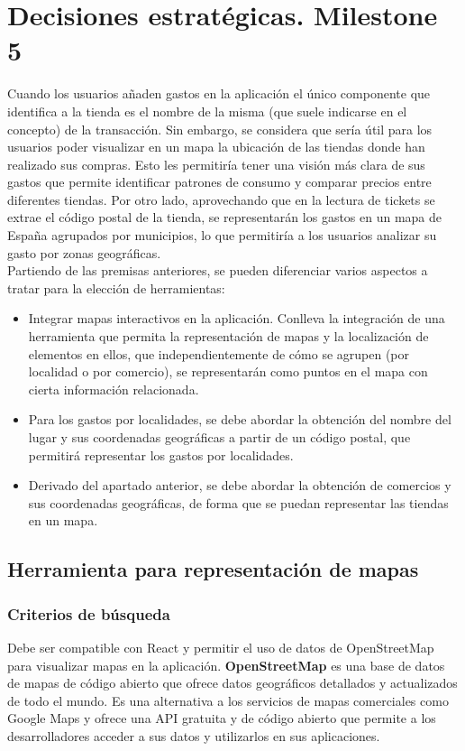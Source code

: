\section{Decisiones estratégicas. Milestone 5}
Cuando los usuarios añaden gastos en la aplicación el único componente que identifica a la tienda es el nombre de la misma (que suele indicarse en el concepto) de la transacción. Sin embargo, se considera que sería útil para los usuarios poder visualizar en un mapa la ubicación de las tiendas donde han realizado sus compras. Esto les permitiría tener una visión más clara de sus gastos que permite identificar patrones de consumo y comparar precios entre diferentes tiendas. Por otro lado, aprovechando que en la lectura de tickets se extrae el código postal de la tienda, se representarán los gastos en un mapa de España agrupados por municipios, lo que permitiría a los usuarios analizar su gasto por zonas geográficas.\\

Partiendo de las premisas anteriores, se pueden diferenciar varios aspectos a tratar para la elección de herramientas:

\begin{itemize}
    \item Integrar mapas interactivos en la aplicación. Conlleva la integración de una herramienta que permita la representación de mapas y la localización de elementos en ellos, que independientemente de cómo se agrupen (por localidad o por comercio), se representarán como puntos en el mapa con cierta información relacionada.
    \item  Para los gastos por localidades, se debe abordar la obtención del nombre del lugar y sus coordenadas geográficas a partir de un código postal, que permitirá representar los gastos por localidades.
    \item Derivado del apartado anterior, se debe abordar la obtención de comercios y sus coordenadas geográficas, de forma que se puedan representar las tiendas en un mapa.  
\end{itemize}


\subsection{Herramienta para representación de mapas}
\subsubsection{Criterios de búsqueda}
Debe ser compatible con React y permitir el uso de datos de OpenStreetMap para visualizar mapas en la aplicación. \textbf{OpenStreetMap} es una base de datos de mapas de código abierto que ofrece datos geográficos detallados y actualizados de todo el mundo. Es una alternativa a los servicios de mapas comerciales como Google Maps y ofrece una API gratuita y de código abierto que permite a los desarrolladores acceder a sus datos y utilizarlos en sus aplicaciones\cite{openstreetmap_about}.

